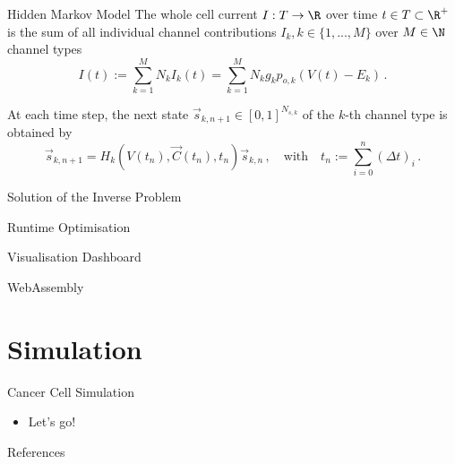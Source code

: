 \documentclass[aspectratio=169, hyperref={colorlinks=true}]{beamer}
\begin{document}
  \begin{frame}{Hidden Markov Model}
    The whole cell current $I: T \to \R$ over time $t \in T \subset \R^+$ is the sum of all individual channel contributions $I_k, k \in \{1, ..., M\}$ over $M \in \N$ channel types
    \begin{equation*}
      I(t) := \sum_{k=1}^{M} N_k I_k(t) = \sum_{k=1}^{M} N_k g_k p_{o,k} \left(V(t)-E_k\right)\,.
      \label{eq:current}
    \end{equation*}

    At each time step, the next state $\vec{s}_{k,n+1} \in [0, 1]^{N_{s,k}}$ of the $k$-th channel type is obtained by
    \begin{equation*}
      \vec{s}_{k,n+1} = H_{k}\left(V(t_n), \vec{C}(t_n), t_n\right) \vec{s}_{k,n}\,,
      \quad\text{with}\quad
      t_n := \sum_{i=0}^n (\Delta t)_i\,.
    \end{equation*}
  \end{frame}

  \begin{frame}{Solution of the Inverse Problem}
  \end{frame}

  \begin{frame}{Runtime Optimisation}

  \end{frame}

  \begin{frame}{Visualisation Dashboard}

  \end{frame}
  \begin{frame}{WebAssembly}
  \end{frame}

  \section{Simulation}
  \begin{frame}{Cancer Cell Simulation}
    \begin{itemize}
      \item Let's go!
    \end{itemize}
  \end{frame}

  \begin{frame}[allowframebreaks]{References}
    \printbibliography
  \end{frame}
\end{document}
